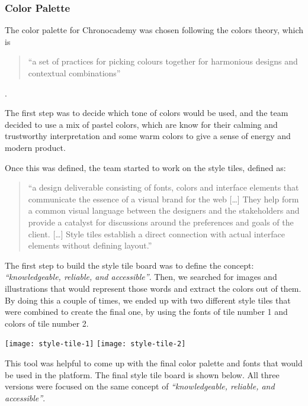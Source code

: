 \subsubsection{Color Palette}\label{subsubsec:color-palette}
The color palette for Chronocademy was chosen following the colors theory, which is

\begin{quote}
``a set of practices for picking colours together for harmonious designs and contextual combinations''
\end{quote}\cite{colorTheory}.

The first step was to decide which tone of colors would be used, and the team decided to use a mix of pastel colors, which are know for their calming and trustworthy interpretation and some warm colors to give a sense of energy and modern product.

Once this was defined, the team started to work on the style tiles, defined as:

\begin{quote}
``a design deliverable consisting of fonts, colors and interface elements that communicate the essence of a visual brand for the web
[\ldots]
They help form a common visual language between the designers and the stakeholders and provide a catalyst for discussions around the preferences and goals of the client.
[\ldots]
Style tiles establish a direct connection with actual interface elements without defining layout.''
\end{quote}\cite{styleTiles}

The first step to build the style tile board was to define the concept: \textit{``knowledgeable, reliable, and accessible''}.
Then, we searched for images and illustrations that would represent those words and extract the colors out of them.
By doing this a couple of times, we ended up with two different style tiles that were combined to create the final one, by using the fonts of tile number 1 and colors of tile number 2.\newline

\texttt{[image: style-tile-1]}\newline
\texttt{[image: style-tile-2]}\newline

This tool was helpful to come up with the final color palette and fonts that would be used in the platform.
The final style tile board is shown below.
All three versions were focused on the same concept of \textit{``knowledgeable, reliable, and accessible''}.\newline

